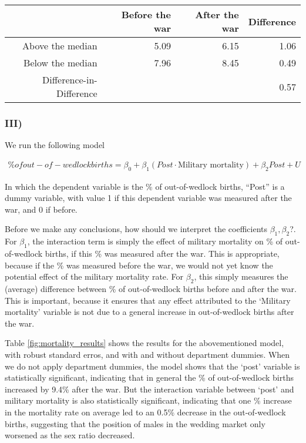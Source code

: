 \documentclass[
]{article}
\begin{document}
\begin{table}[]
\begin{tabular}{r|r|r|r}
                  & Before the war & After the war & Difference \\
                  \hline
 Above the median&  5.09 & 6.15 & 1.06    \\
 \hline
 Below the median&  7.96 & 8.45 & 0.49   \\
 \hline 
 Difference-in-Difference & & & 0.57 \\
\end{tabular}
\end{table}

\hypertarget{iii}{%
\subsubsection{III)}\label{iii}}

We run the following model

\begin{align*}
  \% of out-of-wedlock births = \beta_0 + \beta_1 (Post \cdot \text{Military mortality}) + \beta_2 Post + U
\end{align*}

In which the dependent variable is the \% of out-of-wedlock births,
``Post'' is a dummy variable, with value 1 if this dependent variable
was measured after the war, and 0 if before.

Before we make any conclusions, how should we interpret the coefficients
\(\beta_1, \beta_2\)?. For \(\beta_1\), the interaction term is simply
the effect of military mortality on \% of out-of-wedlock births, if this
\% was measured after the war. This is appropriate, because if the \%
was measured before the war, we would not yet know the potential effect
of the military mortality rate. For \(\beta_2\), this simply measures
the (average) difference between \% of out-of-wedlock births before and
after the war. This is important, because it ensures that any effect
attributed to the `Military mortality' variable is not due to a general
increase in out-of-wedlock births after the war.

Table \ref{fig:mortality_results} shows the results for the
abovementioned model, with robust standard erros, and with and without
department dummies. When we do not apply department dummies, the model
shows that the `post' variable is statistically significant, indicating
that in general the \% of out-of-wedlock births increased by 9.4\% after
the war. But the interaction variable between `post' and military
mortality is also statistically significant, indicating that one \%
increase in the mortality rate on average led to an 0.5\% decrease in
the out-of-wedlock births, suggesting that the position of males in the
wedding market only worsened as the sex ratio decreased.
\end{document}
